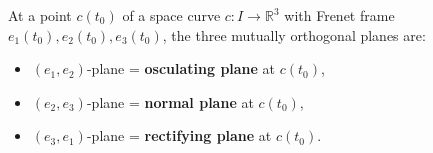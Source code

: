 At a point $c(t_0)$ of a space curve $c: I \to \mathbb{R}^3$ with Frenet frame $e_1(t_0), e_2(t_0), e_3(t_0)$, the three mutually orthogonal planes are:

\begin{itemize}
  \item $(e_1, e_2)$-plane = \textbf{osculating plane} at $c(t_0)$,
  \item $(e_2, e_3)$-plane = \textbf{normal plane} at $c(t_0)$,
  \item $(e_3, e_1)$-plane = \textbf{rectifying plane} at $c(t_0)$.
\end{itemize}
